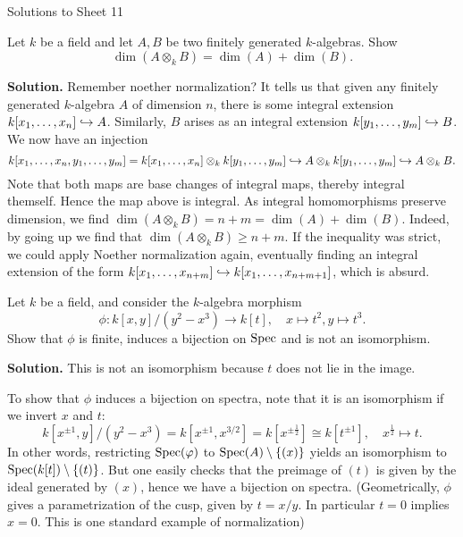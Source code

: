 \documentclass[a4paper,11pt]{article}
\begin{document}
\begin{center}
    \huge{Solutions to Sheet 11}
\end{center}

Let $k$ be a field and let $A,B$ be two finitely generated $k$-algebras.
Show 
\begin{equation*}
    \dim(A \otimes_k B) = \dim(A) + \dim(B).
\end{equation*}

\textbf{Solution.} Remember noether normalization? It tells us that given
any finitely generated $k$-algebra $A$ of dimension $n$, there is some 
integral extension $k[x_1, \dots, x_n] \hookrightarrow A$. Similarly, $B$ arises
as an integral extension $k[y_1, \dots, y_m] \hookrightarrow B$. 
We now have an injection
\begin{equation*}
    k[x_1, \dots, x_n, y_1, \dots, y_m] = k[x_1, \dots, x_n] \otimes_k k[y_1, \dots, y_m] 
    \hookrightarrow A \otimes_k k[y_1, \dots, y_m] \hookrightarrow A \otimes_k B.
\end{equation*}
Note that both maps are base changes of integral maps, thereby integral
themself. Hence the map above is integral. As integral homomorphisms 
preserve dimension, we find $\dim(A \otimes_k B) = n+m = \dim(A) + \dim(B)$. 
Indeed, by going up we find that $\dim(A \otimes_k B) \geq n+m$. If 
the inequality was strict, we could apply Noether normalization again, 
eventually finding an integral extension of the form
$k[x_1, \dots, x_{n+m}] \hookrightarrow k[x_1, \dots, x_{n+m+1}]$, which is 
absurd.

Let $k$ be a field, and consider the $k$-algebra morphism
\begin{equation*}
    \phi: k[x,y]/(y^2 - x^3) \to k[t], \quad x \mapsto t^2, y \mapsto t^3.
\end{equation*}
Show that $\phi$ is finite, induces a bijection on $\operatorname{Spec}$ and is not
an isomorphism.

\textbf{Solution.} This is not an isomorphism because $t$ does not lie 
in the image. 

To show that $\phi$ induces a bijection on spectra, note that it is 
an isomorphism if we invert $x$ and $t$:
\begin{equation*}
    k[x^{\pm 1},y]/(y^2 - x^3) = k[x^{\pm 1}, x^{3/2}] 
    = k[x^{\pm \frac 12}] \cong k[t^{\pm 1}] ,\quad x^{\frac 12} \mapsto t.
\end{equation*}
In other words, restricting $\operatorname{Spec}(\varphi)$ to $\operatorname{Spec}(A)\setminus \{(x)\}$
yields an isomorphism to $\operatorname{Spec}(k[t])\setminus \{(t)\}$. But one easily
checks that the preimage of $(t)$ is given by the ideal generated by 
$(x)$, hence we have a bijection on spectra. (Geometrically, $\phi$
gives a parametrization of the cusp, given by $t = x/y$. In particular
$t = 0$ implies $x = 0$. This is one standard example of normalization)
\end{document}
